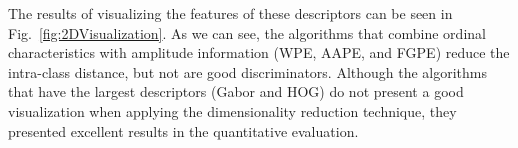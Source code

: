 The results of visualizing the features of these descriptors can be seen in Fig.~\ref{fig:2DVisualization}.
As we can see, the algorithms that combine ordinal characteristics with amplitude information (WPE, AAPE, and FGPE) reduce the intra-class distance, but not are good discriminators.
Although the algorithms that have the largest descriptors (Gabor and HOG) do not present a good visualization when applying the dimensionality reduction technique, they presented excellent results in the quantitative evaluation.


\begin{figure}
	\centering

\end{figure}
